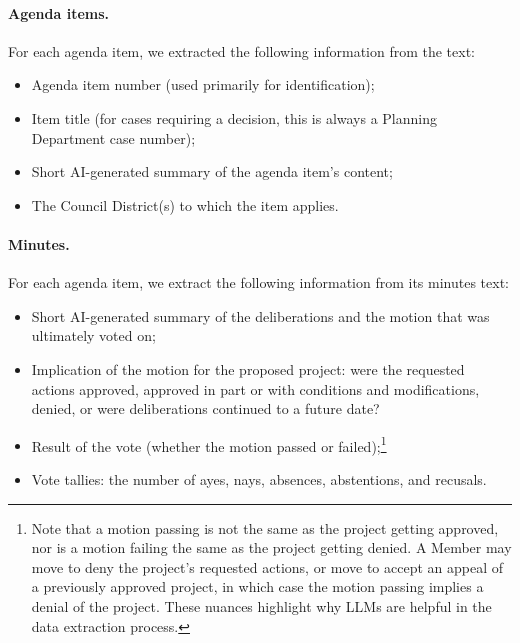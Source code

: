 \paragraph{Agenda items.} For each agenda item, we extracted the following information from the text: 
\begin{itemize}[noitemsep, topsep=0pt]
\item Agenda item number (used primarily for identification);
\item Item title (for cases requiring a decision, this is always a Planning Department case number);
\item Short AI-generated summary of the agenda item's content;
\item The Council District(s) to which the item applies.
\end{itemize}

\paragraph{Minutes.} For each agenda item, we extract the following information from its minutes text:
\begin{itemize}[noitemsep, topsep=0pt]
\item Short AI-generated summary of the deliberations and the motion that was ultimately voted on;
\item Implication of the motion for the proposed project: were the requested actions approved, approved in part or with conditions and modifications, denied, or were deliberations continued to a future date?
\item Result of the vote (whether the motion passed or failed);\footnote{Note that a motion passing is not the same as the project getting approved, nor is a motion failing the same as the project getting denied. A Member may move to deny the project's requested actions, or move to accept an appeal of a previously approved project, in which case the motion passing implies a denial of the project. These nuances highlight why LLMs are helpful in the data extraction process.}
\item Vote tallies: the number of ayes, nays, absences, abstentions, and recusals.
\end{itemize}

